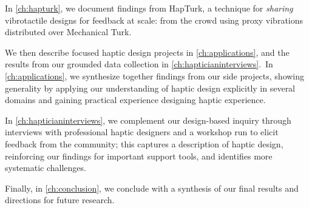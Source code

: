 In \autoref{ch:hapturk}, we document findings from HapTurk, a technique for \emph{sharing} vibrotactile designs for feedback at scale: from the crowd using proxy vibrations distributed over Mechanical Turk. 

We then describe focused haptic design projects in \autoref{ch:applications}, and the results from our grounded data collection in \autoref{ch:hapticianinterviews}.\
In \autoref{ch:applications}, we synthesize together findings from our side projects, showing generality by applying our understanding of haptic design explicitly in several domains and gaining practical experience designing haptic experience.

In \autoref{ch:hapticianinterviews}, we complement our design-based inquiry through interviews with professional haptic designers and a workshop run to elicit feedback from the community; this captures a description of haptic design, reinforcing our findings for important support tools, and identifies more systematic challenges.

Finally, in \autoref{ch:conclusion}, we conclude with a synthesis of our final results and directions for future research.


%
%
\endinput

Any text after an \endinput is ignored.
You could put scraps here or things in progress.

